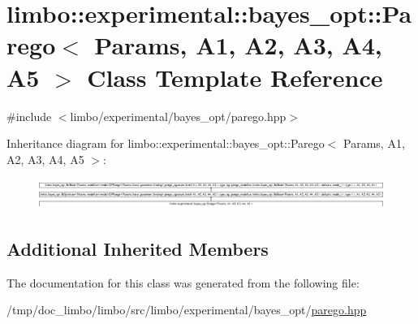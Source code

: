 \hypertarget{classlimbo_1_1experimental_1_1bayes__opt_1_1_parego}{}\section{limbo\+:\+:experimental\+:\+:bayes\+\_\+opt\+:\+:Parego$<$ Params, A1, A2, A3, A4, A5 $>$ Class Template Reference}
\label{classlimbo_1_1experimental_1_1bayes__opt_1_1_parego}


{\ttfamily \#include $<$limbo/experimental/bayes\+\_\+opt/parego.\+hpp$>$}

Inheritance diagram for limbo\+:\+:experimental\+:\+:bayes\+\_\+opt\+:\+:Parego$<$ Params, A1, A2, A3, A4, A5 $>$\+:\begin{figure}[H]
\begin{center}
\leavevmode
\includegraphics[height=0.993495cm]{classlimbo_1_1experimental_1_1bayes__opt_1_1_parego}
\end{center}
\end{figure}
\subsection*{Additional Inherited Members}


The documentation for this class was generated from the following file\+:\begin{DoxyCompactItemize}
\item 
/tmp/doc\+\_\+limbo/limbo/src/limbo/experimental/bayes\+\_\+opt/\hyperlink{parego_8hpp}{parego.\+hpp}\end{DoxyCompactItemize}
